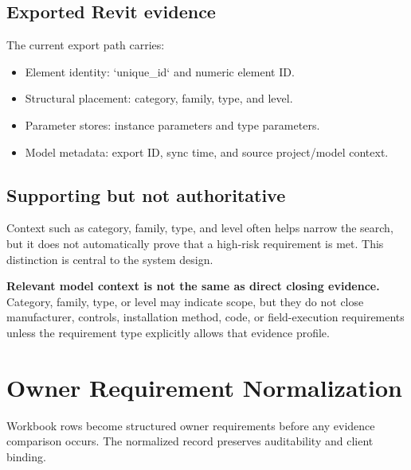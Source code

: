 \documentclass[10pt,letterpaper]{article}
\newcommand{\strong}[1]{\textbf{\textcolor{emaNavy}{#1}}}
\newcommand{\guardrailbox}[1]{%
\begin{tcolorbox}[colback=guardrailBlue,colframe=guardrailBorder,boxrule=0.6pt,arc=2mm,
  left=10pt,right=10pt,top=8pt,bottom=8pt]
\small #1
\end{tcolorbox}}
\begin{document}
\subsection{Exported Revit evidence}

The current export path carries:

\begin{itemize}
  \item Element identity: `unique_id` and numeric element ID.
  \item Structural placement: category, family, type, and level.
  \item Parameter stores: instance parameters and type parameters.
  \item Model metadata: export ID, sync time, and source project/model context.
\end{itemize}

\subsection{Supporting but not authoritative}

Context such as category, family, type, and level often helps narrow the search, but it does not automatically prove that a high-risk requirement is met. This distinction is central to the system design.

\guardrailbox{\strong{Relevant model context is not the same as direct closing evidence.} Category, family, type, or level may indicate scope, but they do not close manufacturer, controls, installation method, code, or field-execution requirements unless the requirement type explicitly allows that evidence profile.}

\section{Owner Requirement Normalization}

Workbook rows become structured owner requirements before any evidence comparison occurs. The normalized record preserves auditability and client binding.
\end{document}
